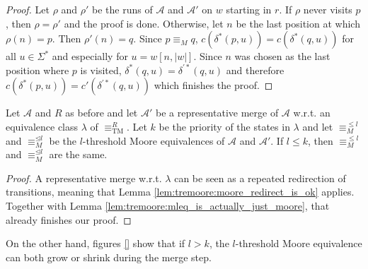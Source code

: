 \begin{proof}
	Let $\rho$ and $\rho'$ be the runs of $\mathcal{A}$ and $\mathcal{A}'$ on $w$ starting in $r$. If $\rho$ never visits $p$, then $\rho = \rho'$ and the proof is done. Otherwise, let $n$ be the last position at which $\rho(n) = p$. Then $\rho'(n) = q$. Since $p \equiv_M q$, $c(\delta^*(p, u)) = c(\delta^*(q, u))$ for all $u \in \Sigma^*$ and especially for $u = w[n, |w|]$. Since $n$ was chosen as the last position where $p$ is visited, $\delta^*(q, u) = \delta^{\prime *}(q, u)$ and therefore $c(\delta^*(p, u)) = c'(\delta^{\prime *}(q, u))$ which finishes the proof.
\end{proof}

\begin{lem}
	Let $\mathcal{A}$ and $R$ as before and let $\mathcal{A}'$ be a representative merge of $\mathcal{A}$ w.r.t. an equivalence class $\lambda$ of $\equiv_\text{TM}^R$. Let $k$ be the priority of the states in $\lambda$ and let $\equiv_M^{\leq l}$ and $\equiv_M^{\unlhd l}$ be the $l$-threshold Moore equivalences of $\mathcal{A}$ and $\mathcal{A}'$. If $l \leq k$, then $\equiv_M^{\leq l}$ and $\equiv_M^{\unlhd l}$ are the same.
\end{lem}

\begin{proof}
	A representative merge w.r.t. $\lambda$ can be seen as a repeated redirection of transitions, meaning that Lemma \ref{lem:tremoore:moore_redirect_is_ok} applies. Together with Lemma \ref{lem:tremoore:mleq_is_actually_just_moore}, that already finishes our proof.
\end{proof}

On the other hand, figures \ref{} show that if $l > k$, the $l$-threshold Moore equivalence can both grow or shrink during the merge step. %















